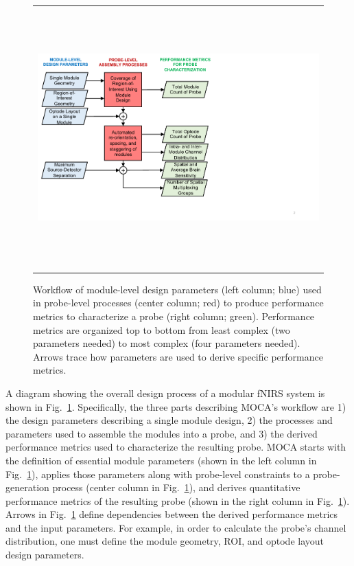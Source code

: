 \begin{figure}
    \begin{center}
    \begin{tabular}{c}
    \includegraphics[height=10cm]{fig/moca/Fig_1.pdf}
    \end{tabular}
    \end{center}
    \caption { \label{fig:flowchart} Workflow of module-level design parameters (left column; blue) used in probe-level processes (center column; red) to produce performance metrics to characterize a probe (right column; green). Performance metrics are organized top to bottom from least complex (two parameters needed) to most complex (four parameters needed). Arrows trace how parameters are used to derive specific performance metrics.} 
\end{figure} 

A diagram showing the overall design process of a modular \ac{fNIRS} system is shown in Fig.~\ref{fig:flowchart}. Specifically, the three parts describing \ac{MOCA}'s workflow are 1) the design parameters describing a single module design, 2) the processes and parameters used to assemble the modules into a probe, and 3) the derived performance metrics used to characterize the resulting probe. \ac{MOCA} starts with the definition of essential module parameters (shown in the left column in Fig.~\ref{fig:flowchart}), applies those parameters along with probe-level constraints to a probe-generation process (center column in Fig.~\ref{fig:flowchart}), and derives quantitative performance metrics of the resulting probe (shown in the right column in Fig.~\ref{fig:flowchart}). Arrows in Fig.~\ref{fig:flowchart} define dependencies between the derived performance metrics and the input parameters. For example, in order to calculate the probe's channel distribution, one must define the module geometry, \ac{ROI}, and optode layout design parameters. 

